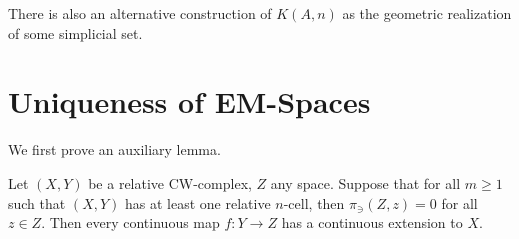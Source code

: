 There is also an alternative construction of $K(A,n)$ as the geometric realization of some simplicial set.

\section{Uniqueness of EM-Spaces}

We first prove an auxiliary lemma.

\begin{lemma}\label{theorem:extension-theorem}
Let $(X,Y)$ be a relative CW-complex, $Z$ any space. Suppose that for all $m\geq1$ such that $(X,Y)$ has at least one relative $n$-cell, then $\pi_\ni(Z,z)=0$ for all $z\in Z$. Then every continuous map $f:Y\to Z$ has a continuous extension to $X$.
\end{lemma}

